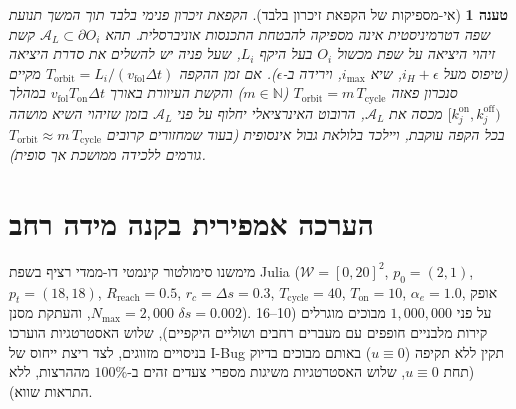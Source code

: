 \documentclass[10pt, a4paper, twocolumn]{article}
\newtheorem{proposition}{טענה}
\begin{document}
\begin{proposition}[אי-מספיקות של הקפאת זיכרון בלבד]
\label{prop:resonance}
הקפאת זיכרון פנימי בלבד תוך המשך תנועת שפה דטרמיניסטית אינה מספיקה להבטחת התכנסות אוניברסלית. תהא $\mathcal{A}_L \subset \partial O_i$ קשת זיהוי היציאה על שפת מכשול $O_i$ בעל היקף $L_i$, שעל פניה יש להשלים את סדרת היציאה (טיפוס מעל $i_H + \epsilon$, שיא $i_{\max}$, וירידה ב-$\epsilon$). אם זמן ההקפה $T_{\text{orbit}} = L_i / (v_{\text{fol}}\Delta t)$ מקיים סנכרון פאזה $T_{\text{orbit}} = m\,T_{\text{cycle}}$ ($m \in \mathbb{N}$) והקשת העיוורת באורך $v_{\text{fol}} T_{\text{on}}\Delta t$ במהלך $[k_j^{\text{on}}, k_j^{\text{off}})$ מכסה את $\mathcal{A}_L$, הרובוט האינרציאלי יחלוף על פני $\mathcal{A}_L$ בזמן שזיהוי השיא מושהה בכל הקפה עוקבת, ויילכד בלולאת גבול אינסופית (בעוד שמחזורים קרובים $T_{\text{orbit}} \approx m\,T_{\text{cycle}}$ גורמים ללכידה ממושכת אך סופית).
\end{proposition}

\section{הערכה אמפירית בקנה מידה רחב}
מימשנו סימולטור קינמטי דו-ממדי רציף בשפת \foreignlanguage{english}{Julia} ($\mathcal{W} = [0, 20]^2$, $p_0 = (2, 1)$, $p_t = (18, 18)$, $R_{\text{reach}} = 0.5$, $r_c = \Delta s = 0.3$, $T_{\text{cycle}} = 40$, $T_{\text{on}} = 10$, $\alpha_e = 1.0$, אופק $N_{\max} = 2,000$, והעתקת מסנן $\delta s = 0.002$). על פני $1,000,000$ מבוכים מוגרלים (10–16 קירות מלבניים חופפים עם מעברים רחבים ושוליים היקפיים), שלוש האסטרטגיות הוערכו בניסויים מזווגים, לצד ריצת ייחוס של \foreignlanguage{english}{I-Bug} תקין ללא תקיפה ($u \equiv 0$) באותם מבוכים בדיוק (תחת $u \equiv 0$, שלוש האסטרטגיות משיגות מספרי צעדים זהים ב-$100\%$ מההרצות, ללא התראות שווא).
\end{document}
